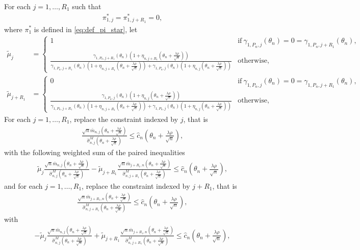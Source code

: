 \documentclass[letterpaper,11pt]{article}
\theoremstyle{myplain}
\theoremstyle{mydefinition}
\theoremstyle{myremark}
\newcommand{\larhon}{\frac{\lambda \rho }{\sqrt n}}
\newcommand{\tlarhon}{\tfrac{\lambda \rho }{\sqrt n}}
\numberwithin{equation}{section}
\numberwithin{figure}{section}
\begin{document}
\begin{appendices}
For each $j=1,\dots,R_1$ such that 
\begin{align}
\pi^*_{1,j} = \pi^*_{1,j+R_1} = 0, \label{eq:cond_both_CT_binding}
\end{align}
where $\pi^*_{1}$ is defined in \eqref{eq:def_pi_star}, let 
\begin{align}
\tilde\mu_j &=\left\{\begin{matrix}
 1 & \mathrm{if}~ \gamma_{1,P_n,j}(\theta_n)=0=\gamma_{1,P_n,j+R_1}(\theta_n),\\
\frac{\gamma_{1,P_n,j+R_1}(\theta_n)(1+\eta_{n,j+R_1}(\theta_n+\larhon))}{\gamma_{1,P_n,j+R_1}(\theta_n)(1+\eta_{n,j+R_1}(\theta_n+\larhon))+\gamma_{1,P_n,j}(\theta_n)(1+\eta_{n,j}(\theta_n+\larhon))} & \mathrm{otherwise},
\end{matrix}\right. \label{eq:tilde_weight_j}\\
\tilde\mu_{j+R_1}&=\left\{\begin{matrix}
 0 & \mathrm{if}~ \gamma_{1,P_n,j}(\theta_n)=0=\gamma_{1,P_n,j+R_1}(\theta_n),\\
\frac{\gamma_{1,P_n,j}(\theta_n)(1+\eta_{n,j}(\theta_n+\larhon))}{\gamma_{1,P_n,j+R_1}(\theta_n)(1+\eta_{n,j+R_1}(\theta_n+\larhon))+\gamma_{1,P_n,j}(\theta_n)(1+\eta_{n,j}(\theta_n+\larhon))} & \mathrm{otherwise},
\end{matrix}\right. \label{eq:tilde_weight_j_pl_J11}
\end{align}
For each $j=1,\dots,R_1$, replace the constraint indexed by $j$, that is
\begin{align}
\frac{\sqrt n\bar{m}_{n,j}(\theta_n+\larhon)}{\hat\sigma^M_{n,j}(\theta_n+\tlarhon)}\le  \hat{c}_n(\theta_n+\tlarhon),\label{eq:replace_CT_LB}
\end{align}
with the following weighted sum of the paired inequalities
\begin{align}
\tilde\mu_j\frac{\sqrt n\bar{m}_{n,j}(\theta_n+\larhon)}{\hat\sigma^M_{n,j}(\theta_n+\larhon)}-\tilde\mu_{j+R_1}\frac{\sqrt n\bar{m}_{j+R_1,n}(\theta_n+\larhon)}{\hat\sigma^M_{n,j+R_1}(\theta_n+\tlarhon)}\le  \hat{c}_n(\theta_n+\tlarhon), \label{eq:replace_CT_mix_LB}
\end{align}
and for each $j=1,\dots,R_1$, replace the constraint indexed by $j+R_1$, that is
\begin{align}
\frac{\sqrt n\bar{m}_{j+R_1,n}(\theta_n+\larhon)}{\hat\sigma^M_{n,j+R_1}(\theta_n+\larhon)}\le  \hat{c}_n(\theta_n+\tlarhon), \label{eq:replace_CT_UB}
\end{align}
with
\begin{align}
-\tilde\mu_j\frac{\sqrt n\bar{m}_{n,j}(\theta_n+\larhon)}{\hat\sigma^M_{n,j}(\theta_n+\larhon)}+\tilde\mu_{j+R_1}\frac{\sqrt n\bar{m}_{j+R_1,n}(\theta_n+\larhon)}{\hat\sigma^M_{n,j+R_1}(\theta_n+\larhon)}\le  \hat{c}_n(\theta_n+\tlarhon),\label{eq:replace_CT_mix_UB}

\end{align}
\end{appendices}
\end{document}
